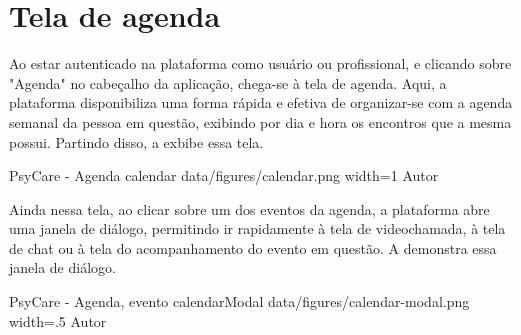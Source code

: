 \section{Tela de agenda}
\label{sec:agenda}

Ao estar autenticado na plataforma como usuário ou profissional, e clicando sobre "Agenda" no cabeçalho da aplicação, chega-se à tela de agenda. Aqui, a plataforma disponibiliza uma forma rápida e efetiva de organizar-se com a agenda semanal da pessoa em questão, exibindo por dia e hora os encontros que a mesma possui. Partindo disso, a  exbibe essa tela.

\image
    {PsyCare - Agenda}
    {calendar}
    {data/figures/calendar.png}
    {width=1\textwidth}
    {Autor}

Ainda nessa tela, ao clicar sobre um dos eventos da agenda, a plataforma abre uma janela de diálogo, permitindo ir rapidamente à tela de videochamada, à tela de chat ou à tela do acompanhamento do evento em questão. A  demonstra essa janela de diálogo.

\image
    {PsyCare - Agenda, evento}
    {calendarModal}
    {data/figures/calendar-modal.png}
    {width=.5\textwidth}
    {Autor}
